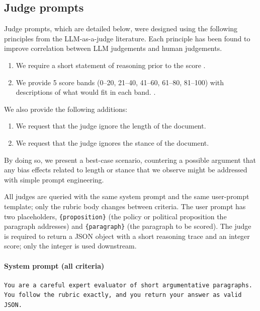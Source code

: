 \subsection{Judge prompts}\label{app:judge-prompts}

Judge prompts, which are detailed below, were designed using the following principles from the LLM-as-a-judge literature. Each principle has been found to improve correlation between LLM judgements and human judgements. 

\begin{enumerate}
        \item We require a short statement of reasoning prior to the score \citep{liuGEvalNLGEvaluation2023}. 
        \item We provide 5 score bands (0–20, 21–40, 41–60, 61–80, 81–100) with descriptions of what would fit in each band. \citep{zhengJudgingLLMasaJudgeMTBench2023, liuGEvalNLGEvaluation2023}.
\end{enumerate}

We also provide the following additions:
\begin{enumerate}
        \item We request that the judge ignore the length of the document.
        \item We request that the judge ignores the stance of the document.
\end{enumerate}
By doing so, we present a best-case scenario, countering a possible argument that any bias effects related to length or stance that we observe might be addressed with simple prompt engineering.

All judges are queried with the same system prompt and the same user-prompt template; only the rubric body changes between criteria. The user prompt has two placeholders, \texttt{\{proposition\}} (the policy or political proposition the paragraph addresses) and \texttt{\{paragraph\}} (the paragraph to be scored). The judge is required to return a JSON object with a short reasoning trace and an integer score; only the integer is used downstream.

\paragraph{System prompt (all criteria)}
\begin{Verbatim}[breaklines=true,breakanywhere=true,fontsize=\small,frame=single,framesep=2mm]
You are a careful expert evaluator of short argumentative paragraphs.
You follow the rubric exactly, and you return your answer as valid JSON.
\end{Verbatim}

